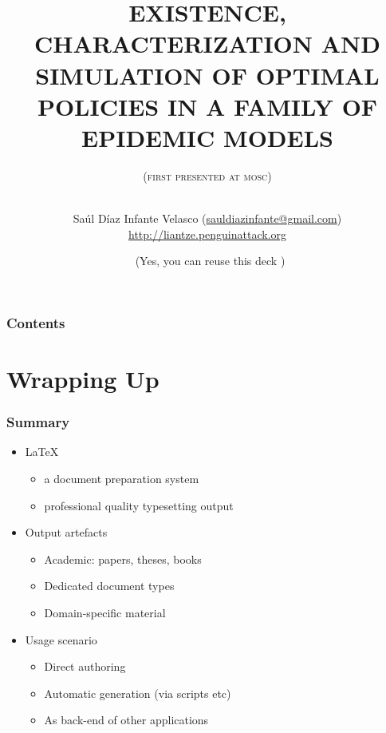 \documentclass[xcolor={x11names,svgnames,dvipsnames},trans]{beamer}
\author[Sa\'ul D\'iaz Infante Velasco]{
    \texorpdfstring{
        Sa\'ul D\'iaz Infante Velasco
        (\url{sauldiazinfante@gmail.com})
        \\
        \url{http://liantze.penguinattack.org}}
        {LianTze Lim (Ph.D.)}
    }
\title{
    EXISTENCE, CHARACTERIZATION AND SIMULATION OF OPTIMAL
    POLICIES IN A FAMILY OF EPIDEMIC MODELS}
\subtitle{\texorpdfstring{(\textsc{first presented at mosc}\oldstylenums{2011})\\%
\hrulefill\ \adforn{57}\thickspace\wb{m}\thickspace\adforn{29}\ \hrulefill}{First Presented at MOSC 2011; some modifications since}}
\date[\ccbyncsa]{\ccbyncsa\ (Yes, you can reuse this deck \Smiley)}
\begin{document}
\begin{frame}[plain]
\maketitle
\end{frame}

\begin{frame}
\frametitle{Contents}
\tableofcontents
\end{frame}






\section{Wrapping Up}

\begin{frame}
\frametitle{Summary}
\begin{itemize}
\item<+-> \LaTeX
	\begin {itemize}
	\item a document preparation system
	\item professional quality typesetting output
	\end{itemize}
\item<+-> Output artefacts
	\begin{itemize}
	\item Academic: papers, theses, books
	\item Dedicated document types
	\item Domain-specific material
	\end{itemize}
\item<+-> Usage scenario
	\begin{itemize}
	\item Direct authoring
	\item Automatic generation (via scripts etc)
	\item As back-end of other applications
	\end{itemize}
\end{itemize}
\end{frame}
\end{document}

